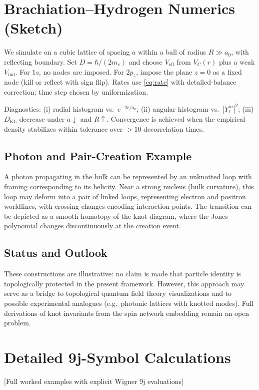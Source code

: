 \documentclass[11pt]{article}
\theoremstyle{plain}
\theoremstyle{definition}
\begin{document}
\section{Brachiation–Hydrogen Numerics (Sketch)}
\label{app:brach-numerics}

We simulate on a cubic lattice of spacing $a$ within a ball of radius $R\!\gg\!a_0$, with reflecting boundary. Set $D=\hbar/(2m_e)$ and choose $V_{\mathrm{eff}}$ from $V_C(r)$ plus a weak $V_{\mathrm{ind}}$. For $1s$, no nodes are imposed. For $2p_z$, impose the plane $z=0$ as a fixed node (kill or reflect with sign flip). Rates use \eqref{eq:rate} with detailed-balance correction; time step chosen by uniformization.

Diagnostics:
(i) radial histogram vs.\ $e^{-2r/a_0}$;
(ii) angular histogram vs.\ $|Y_\ell^m|^2$;
(iii) $D_{\mathrm{KL}}$ decrease under $a\downarrow$ and $R\uparrow$.
Convergence is achieved when the empirical density stabilizes within tolerance over $>10$ decorrelation times.

\subsection{Photon and Pair-Creation Example}
A photon propagating in the bulk can be represented by an unknotted loop with framing corresponding to its helicity.
Near a strong nucleus (bulk curvature), this loop may deform into a pair of linked loops, representing electron and positron worldlines, with crossing changes encoding interaction points.
The transition can be depicted as a smooth homotopy of the knot diagram, where the Jones polynomial changes discontinuously at the creation event.

\subsection{Status and Outlook}
These constructions are illustrative: no claim is made that particle identity is topologically protected in the present framework.
However, this approach may serve as a bridge to topological quantum field theory visualizations and to possible experimental analogues (e.g.\ photonic lattices with knotted modes).
Full derivations of knot invariants from the spin network embedding remain an open problem.

\section{Detailed 9j-Symbol Calculations}
[Full worked examples with explicit Wigner 9j evaluations]
\end{document}

